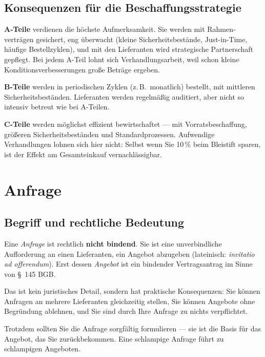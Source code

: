 \documentclass[11pt, a4paper]{article}
\begin{document}
\subsection{Konsequenzen für die Beschaffungs­strategie}

\textbf{A-Teile} verdienen die höchste Aufmerksamkeit. Sie werden mit Rahmen­verträgen
gesichert, eng überwacht (kleine Sicherheits­bestände, Just-in-Time, häufige Bestell­zyklen),
und mit den Lieferanten wird strategische Partnerschaft gepflegt. Bei jedem A-Teil lohnt
sich Verhandlungs­arbeit, weil schon kleine Konditions­verbesserungen große Beträge ergeben.

\textbf{B-Teile} werden in periodischen Zyklen (z.\,B.\ monatlich) bestellt, mit mittleren
Sicherheits­beständen. Lieferanten werden regelmäßig auditiert, aber nicht so intensiv
betreut wie bei A-Teilen.

\textbf{C-Teile} werden möglichst effizient bewirtschaftet --- mit Vorrats\-beschaffung,
größeren Sicherheits­beständen und Standard­prozessen. Aufwendige Verhandlungen lohnen
sich hier nicht: Selbst wenn Sie 10\,\% beim Bleistift sparen, ist der Effekt am
Gesamt­einkauf vernachlässigbar.

\section{Anfrage}

\subsection{Begriff und rechtliche Bedeutung}

\begin{merksatz}[title={Wichtig}]
Eine \emph{Anfrage} ist rechtlich \textbf{nicht bindend}. Sie ist eine unverbindliche
Aufforderung an einen Lieferanten, ein Angebot abzugeben (lateinisch:
\emph{invitatio ad offerendum}). Erst dessen \emph{Angebot} ist ein bindender
Vertragsantrag im Sinne von \S~145 BGB.
\end{merksatz}

Das ist kein juristisches Detail, sondern hat praktische Konsequenzen: Sie können
Anfragen an mehrere Lieferanten gleichzeitig stellen, Sie können Angebote ohne Begründung
ablehnen, und Sie sind durch Ihre Anfrage zu nichts verpflichtet.

Trotzdem sollten Sie die Anfrage sorgfältig formulieren --- sie ist die Basis für das
Angebot, das Sie zurück­bekommen. Eine schlampige Anfrage führt zu schlampigen Angeboten.
\end{document}
